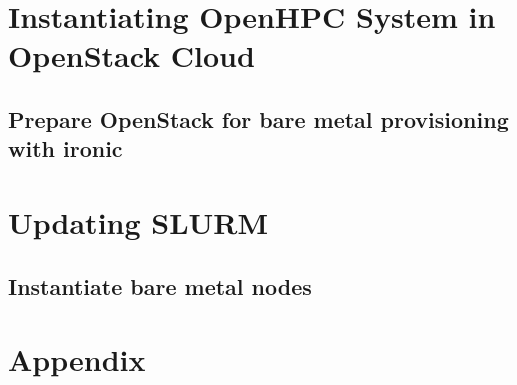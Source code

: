 \documentclass[letterpaper]{article}
\begin{document}





\vspace*{-0.15cm}
\vspace*{-0.50cm}

\clearpage
\section{Instantiating OpenHPC System in OpenStack Cloud}

	
\clearpage
\subsection{Prepare OpenStack for bare metal provisioning with ironic} \label{sec:o-s_prep-ironic}


\section{Updating SLURM}

	

\vspace*{-0.15cm}
\newpage
\subsection{Instantiate bare metal nodes} \label{sec:instantiate-bare-metal}


\section{Appendix}

	

\end{document}
